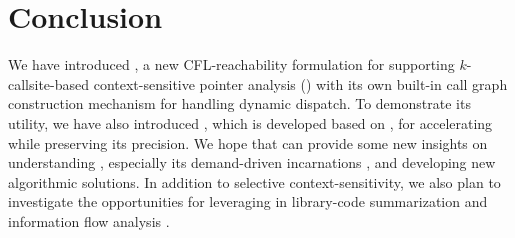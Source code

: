 
\balance

\section{Conclusion}
\label{sec:conclusion}

We have introduced \LFCR, a new CFL-reachability formulation for supporting
$k$-callsite-based context-sensitive pointer analysis () with its own built-in
call graph construction mechanism for handling dynamic dispatch. 
To demonstrate its utility, we have also introduced
\tool, which is developed based on \LFCR, for accelerating  while preserving its precision. 
We hope that \LFCR can provide some new insights on understanding
,  especially its demand-driven incarnations \cite{sridharan2005demand, sridharan2006refinement, yan2011demand},
and developing  new algorithmic solutions. In addition to selective context-sensitivity,
we also plan  to investigate the opportunities for leveraging \LFCR in
library-code summarization \cite{shang2012demand,  tang2015summary, chen2021accelerating} and
  information flow analysis \cite{li2020fast, milanova2020flowcfl}.


